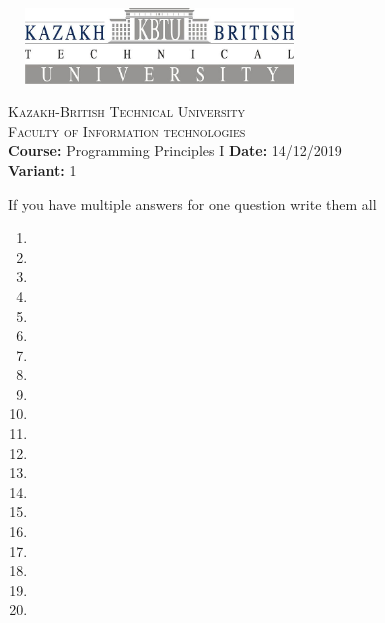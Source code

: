 \documentclass[11pt]{article}
\begin{document}
\Large

\begin{center}
\includegraphics[width=8cm, height=2cm]{kbtu.jpg}
\end{center}

\begin{center}
	\begin{minipage}{11.4cm}
		\begin{center}
				{\small \textsc{Kazakh-British Technical University}			\\
						  \textsc{Faculty of Information technologies} \\
                         \textbf{Course:} Programming Principles I \hspace{.65cm}\textbf{Date:} 14/12/2019\\\textbf{Variant:} 1\\
                }
		\end{center}
	\end{minipage}
\end{center}

{If you have multiple answers for one question write them all}
\begin{multicols}{5}
\begin{enumerate}
\item \item \item \item \item \item \item \item \item \item \item \item \item \item \item \item \item \item \item \item
\end{enumerate}
\end{multicols}
\end{document}

